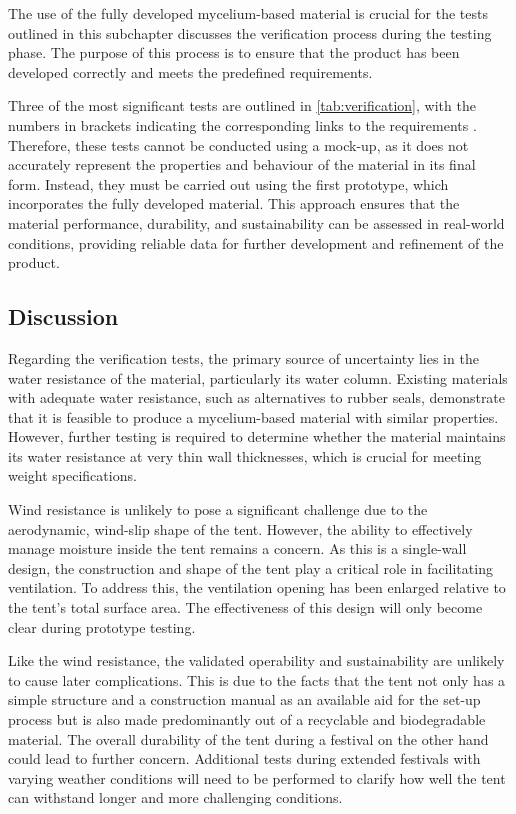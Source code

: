 \documentclass{article}
\begin{document}
The use of the fully developed mycelium-based material is crucial for the tests outlined
in this subchapter discusses the verification process during the testing phase. The purpose
of this process is to ensure that the product has been developed correctly and meets the
predefined requirements.

Three of the most significant tests are outlined in \autoref{tab:verification}, with the numbers in brackets
indicating the corresponding links to the requirements . Therefore, these tests cannot be
conducted using a mock-up, as it does not accurately represent the properties and
behaviour of the material in its final form. Instead, they must be carried out using the first
prototype, which incorporates the fully developed material. This approach ensures that
the material performance, durability, and sustainability can be assessed in real-world
conditions, providing reliable data for further development and refinement of the
product.

\subsection{Discussion}
Regarding the verification tests, the primary source of uncertainty lies in the water resistance
of the material, particularly its water column. Existing materials with adequate water
resistance, such as alternatives to rubber seals, demonstrate that it is feasible to produce a
mycelium-based material with similar properties. However, further testing is required to
determine whether the material maintains its water resistance at very thin wall thicknesses,
which is crucial for meeting weight specifications.

Wind resistance is unlikely to pose a significant challenge due to the aerodynamic, wind-slip
shape of the tent. However, the ability to effectively manage moisture inside the tent remains
a concern. As this is a single-wall design, the construction and shape of the tent play a critical
role in facilitating ventilation. To address this, the ventilation opening has been enlarged
relative to the tent's total surface area. The effectiveness of this design will only become clear
during prototype testing.

Like the wind resistance, the validated operability and sustainability are unlikely to cause later
complications. This is due to the facts that the tent not only has a simple structure and a
construction manual as an available aid for the set-up process but is also made predominantly
out of a recyclable and biodegradable material. The overall durability of the tent during a
festival on the other hand could lead to further concern. Additional tests during extended
festivals with varying weather conditions will need to be performed to clarify how well the
tent can withstand longer and more challenging conditions.
\end{document}
